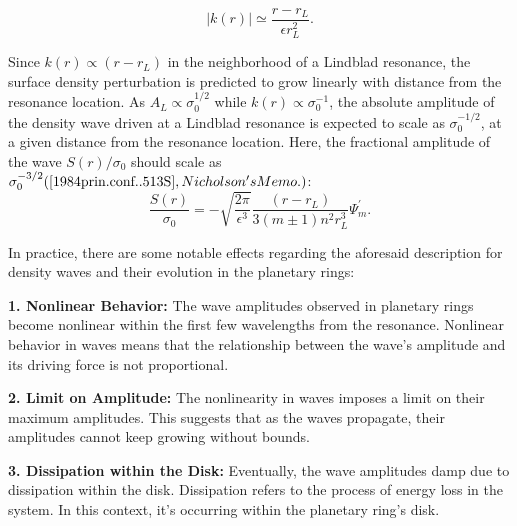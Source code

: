 \documentclass{article}
\begin{document}
\begin{equation}
    |k(r)| \simeq \frac{r - r_{L}}{\epsilon r_{L}^{2}}.
\end{equation}

Since $k(r) \propto (r - r_{L})$ in the neighborhood of a Lindblad resonance, the surface density perturbation is predicted to grow linearly with distance from the resonance location. As $A_{L} \propto \sigma_{0}^{1/2}$ while $k(r) \propto \sigma_{0}^{-1}$, the absolute amplitude of the density wave driven at a Lindblad resonance is expected to scale as $\sigma_{0}^{-1/2}$, at a given distance from the resonance location. Here, the fractional amplitude of the wave $S(r)/\sigma_{0}$ should scale as $\sigma_{0}^{-3/2} (\cite{1984prin.conf..513S}, Nicholson's Memo.)$:
\begin{equation}
    \frac{S(r)}{\sigma_{0}} = - \sqrt{\frac{2\pi}{\epsilon^{3}}} \frac{(r - r_{L})}{3(m \pm 1) n^{2} r_{L}^{3}} \Psi_{m}^{'}.
\end{equation}

In practice, there are some notable effects regarding the aforesaid description for density waves and their evolution in the planetary rings:

\textbf{1. Nonlinear Behavior:} The wave amplitudes observed in planetary rings become nonlinear within the first few wavelengths from the resonance. Nonlinear behavior in waves means that the relationship between the wave's amplitude and its driving force is not proportional.

\textbf{2. Limit on Amplitude:} The nonlinearity in waves imposes a limit on their maximum amplitudes. This suggests that as the waves propagate, their amplitudes cannot keep growing without bounds.

\textbf{3. Dissipation within the Disk:} Eventually, the wave amplitudes damp due to dissipation within the disk. Dissipation refers to the process of energy loss in the system. In this context, it's occurring within the planetary ring's disk.
\end{document}
